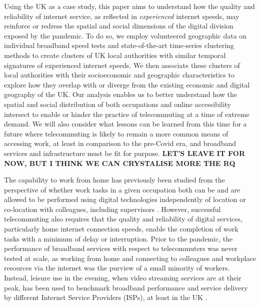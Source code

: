 \documentclass[,]{sagej}
\begin{document}
Using the UK as a case study, this paper aims to understand how the
quality and reliability of internet service, as reflected in
\emph{experienced} internet speeds, may reinforce or redress the spatial
and social dimensions of the digital division exposed by the pandemic.
To do so, we employ volunteered geographic data on individual broadband
speed tests and state-of-the-art time-series clustering methods to
create clusters of UK local authorities with similar temporal signatures
of experienced internet speeds. We then associate these clusters of
local authorities with their socioeconomic and geographic
characteristics to explore how they overlap with or diverge from the
existing economic and digital geography of the UK. Our analysis enables
us to better understand how the spatial and social distribution of both
occupations and online accessibility intersect to enable or hinder the
practice of telecommuting at a time of extreme demand. We will also
consider what lessons can be learned from this time for a future where
telecommuting is likely to remain a more common means of accessing work,
at least in comparison to the pre-Covid era, and broadband services and
infrastructure must be fit for purpose. \textbf{LET'S LEAVE IT FOR NOW,
BUT I THINK WE CAN CRYSTALISE MORE THE RQ}

The capability to work from home has previously been studied from the
perspective of whether work tasks in a given occupation both can be and
are allowed to be performed using digital technologies independently of
location or co-location with colleagues, including supervisors
\citep{allen2015effective, singh2013modeling}. However, successful
telecommuting also requires that the quality and reliability of digital
services, particularly home internet connection speeds, enable the
completion of work tasks with a minimum of delay or interruption. Prior
to the pandemic, the performance of broadband services with respect to
telecommuters was never tested at scale, as working from home and
connecting to colleagues and workplace resources via the internet was
the purview of a small minority of workers. Instead, leisure use in the
evening, when video streaming services are at their peak, has been used
to benchmark broadband performance and service delivery by different
Internet Service Providers (ISPs), at least in the UK \citep{ofcom2017}.
\end{document}
